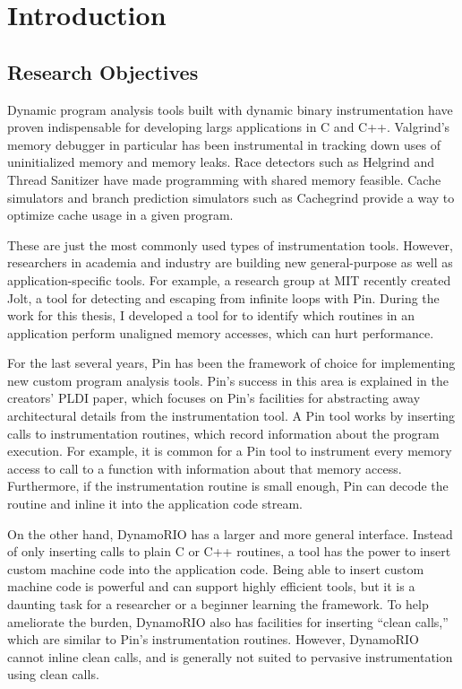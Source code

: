 \chapter{Introduction}

\section{Research Objectives}

Dynamic program analysis tools built with dynamic binary instrumentation have
proven indispensable for developing largs applications in C and C++.
Valgrind's\cite{valgrind} memory debugger in particular has been instrumental in
tracking down uses of uninitialized memory and memory leaks.  Race detectors
such as Helgrind\cite{helgrind} and Thread Sanitizer\cite{tsan} have made
programming with shared memory feasible.  Cache simulators and branch prediction
simulators such as Cachegrind\cite{valgrind_workloads} provide a way to optimize
cache usage in a given program.

These are just the most commonly used types of instrumentation tools.  However,
researchers in academia and industry are building new general-purpose as well as
application-specific tools.  For example, a research group at MIT recently
created Jolt\cite{jolt}, a tool for detecting and escaping from infinite loops
with Pin\cite{pin}.  During the work for this thesis, I developed a tool for to
identify which routines in an application perform unaligned memory accesses,
which can hurt performance.

For the last several years, Pin has been the framework of choice for
implementing new custom program analysis tools.  Pin's success in this area is
explained in the creators' PLDI paper, which focuses on Pin's facilities for
abstracting away architectural details from the instrumentation tool.  A Pin
tool works by inserting calls to instrumentation routines, which record
information about the program execution.  For example, it is common for a Pin
tool to instrument every memory access to call to a function with information
about that memory access.  Furthermore, if the instrumentation routine is small
enough, Pin can decode the routine and inline it into the application code
stream.

On the other hand, DynamoRIO\cite{bruening_phd} has a larger and more general
interface.  Instead of only inserting calls to plain C or C++ routines, a tool
has the power to insert custom machine code into the application code.  Being
able to insert custom machine code is powerful and can support highly efficient
tools, but it is a daunting task for a researcher or a beginner learning the
framework.  To help ameliorate the burden, DynamoRIO also has facilities for
inserting ``clean calls,'' which are similar to Pin's instrumentation routines.
However, DynamoRIO cannot inline clean calls, and is generally not suited to
pervasive instrumentation using clean calls.

